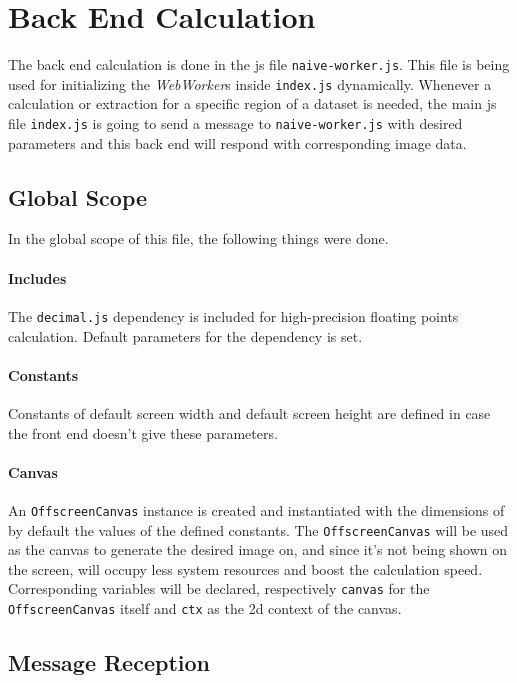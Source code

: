 \section{Back End Calculation}

The back end calculation is done in the \gls{js} file \texttt{naive-worker.js}. This file is being used for initializing the \emph{WebWorker}s inside \texttt{index.js} dynamically. Whenever a calculation or extraction for a specific region of a dataset is needed, the main \gls{js} file \texttt{index.js} is going to send a message to \texttt{naive-worker.js} with desired parameters and this back end will respond with corresponding image data.

\subsection{Global Scope}

In the global scope of this file, the following things were done.

\paragraph{Includes} The \texttt{decimal.js} dependency is included for high-precision floating points calculation. Default parameters for the dependency is set.

\paragraph{Constants} Constants of default screen width and default screen height are defined in case the front end doesn't give these parameters.

\paragraph{Canvas} An \texttt{OffscreenCanvas} instance is created and instantiated with the dimensions of by default the values of the defined constants. The \texttt{OffscreenCanvas} will be used as the canvas to generate the desired image on, and since it's not being shown on the screen, will occupy less system resources and boost the calculation speed. Corresponding variables will be declared, respectively \texttt{canvas} for the \texttt{OffscreenCanvas} itself and \texttt{ctx} as the 2d context of the canvas.

\subsection{Message Reception}


